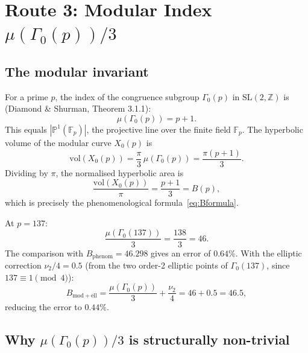\documentclass[12pt,a4paper]{article}
\theoremstyle{definition}
\theoremstyle{remark}
\begin{document}
\section{Route 3: Modular Index $\mu(\Gamma_0(p))/3$}
\label{sec:modular}

\subsection{The modular invariant}

For a prime $p$, the index of the congruence subgroup $\Gamma_0(p)$ in
$\mathrm{SL}(2,\mathbb{Z})$ is (Diamond \& Shurman, Theorem 3.1.1):
\begin{equation}
  \mu(\Gamma_0(p)) = p + 1.
  \label{eq:modindex}
\end{equation}
This equals $|\mathbb{P}^1(\mathbb{F}_p)|$, the projective line over the finite
field $\mathbb{F}_p$.  The hyperbolic volume of the modular curve $X_0(p)$ is
\begin{equation}
  \mathrm{vol}(X_0(p)) = \frac{\pi}{3}\,\mu(\Gamma_0(p)) = \frac{\pi(p+1)}{3}.
  \label{eq:volX0}
\end{equation}
Dividing by $\pi$, the normalised hyperbolic area is
\begin{equation}
  \frac{\mathrm{vol}(X_0(p))}{\pi} = \frac{p+1}{3} = B(p),
  \label{eq:BmodIndex}
\end{equation}
which is precisely the phenomenological formula~\eqref{eq:Bformula}.

At $p = 137$:
\begin{equation}
  \frac{\mu(\Gamma_0(137))}{3} = \frac{138}{3} = 46.
  \label{eq:B137modular}
\end{equation}
The comparison with $B_{\mathrm{phenom}} = 46.298$ gives an error of $0.64\%$.
With the elliptic correction $\nu_2/4 = 0.5$ (from the two order-2 elliptic
points of $\Gamma_0(137)$, since $137 \equiv 1 \pmod{4}$):
\begin{equation}
  B_{\mathrm{mod+ell}} = \frac{\mu(\Gamma_0(p))}{3} + \frac{\nu_2}{4}
  = 46 + 0.5 = 46.5,
  \label{eq:BmodEll}
\end{equation}
reducing the error to $0.44\%$.

\subsection{Why $\mu(\Gamma_0(p))/3$ is structurally non-trivial}
\end{document}
